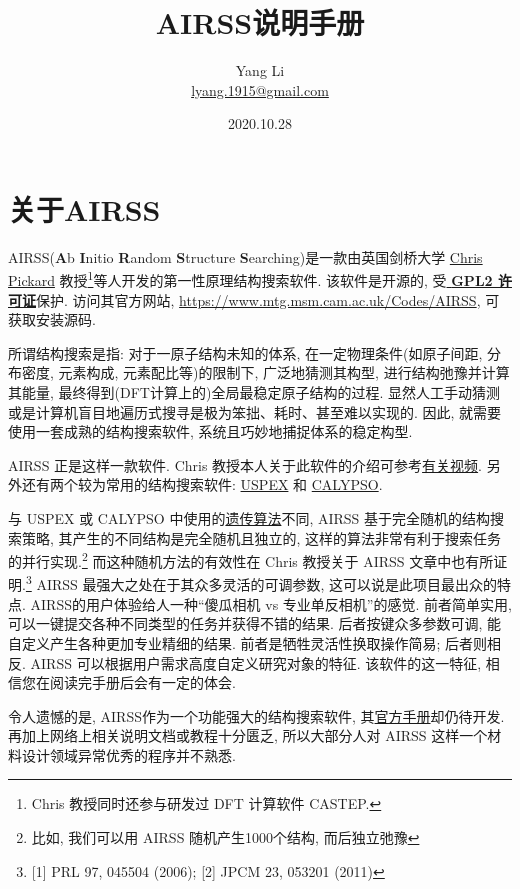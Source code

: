 \documentclass[a4paper, 10pt]{article}
\title{\textbf{AIRSS说明手册}}
\author{Yang Li\\ \href{mailto:lyang.1915@gmail.com}{lyang.1915@gmail.com}}
\date{2020.10.28}
\begin{document}
\maketitle
\tableofcontents

\newpage
\section{关于AIRSS}
AIRSS(\textbf{A}b \textbf{I}nitio \textbf{R}andom \textbf{S}tructure \textbf{S}earching)是一款由英国剑桥大学 \href{https://www.mtg.msm.cam.ac.uk/People/CJP}{Chris Pickard} 教授\footnote{Chris 教授同时还参与研发过 DFT 计算软件 CASTEP.}等人开发的第一性原理结构搜索软件. 该软件是开源的, 受\href{https://en.wikipedia.org/wiki/GNU_General_Public_License}{\textbf{ GPL2 许可证}}保护. 访问其官方网站, \url{https://www.mtg.msm.cam.ac.uk/Codes/AIRSS}, 可获取安装源码. 
  
所谓结构搜索是指: 对于一原子结构未知的体系, 在一定物理条件(如原子间距, 分布密度, 元素构成, 元素配比等)的限制下, 广泛地猜测其构型, 进行结构弛豫并计算其能量, 最终得到(DFT计算上的)全局最稳定原子结构的过程. 显然人工手动猜测或是计算机盲目地遍历式搜寻是极为笨拙、耗时、甚至难以实现的. 因此, 就需要使用一套成熟的结构搜索软件, 系统且巧妙地捕捉体系的稳定构型.

AIRSS 正是这样一款软件. Chris 教授本人关于此软件的介绍可参考\href{https://www.youtube.com/watch?v=xW6pOYEIKVs&t=1061s}{有关视频}. 另外还有两个较为常用的结构搜索软件: \href{https://uspex-team.org/en/uspex/downloads}{USPEX} 和 \href{http://www.calypso.cn}{CALYPSO}.

与 USPEX 或 CALYPSO 中使用的\href{https://en.wikipedia.org/wiki/Genetic_algorithm}{遗传算法}不同, AIRSS 基于完全随机的结构搜索策略, 其产生的不同结构是完全随机且独立的, 这样的算法非常有利于搜索任务的并行实现.\footnote{比如, 我们可以用 AIRSS 随机产生1000个结构, 而后独立弛豫} 而这种随机方法的有效性在 Chris 教授关于 AIRSS 文章中也有所证明.\footnote{ [1] PRL 97, 045504 (2006); [2] JPCM 23, 053201 (2011)} AIRSS 最强大之处在于其众多灵活的可调参数, 这可以说是此项目最出众的特点. AIRSS的用户体验给人一种``傻瓜相机 vs 专业单反相机''的感觉. 前者简单实用, 可以一键提交各种不同类型的任务并获得不错的结果. 后者按键众多参数可调, 能自定义产生各种更加专业精细的结果. 前者是牺牲灵活性换取操作简易; 后者则相反. AIRSS 可以根据用户需求高度自定义研究对象的特征. 该软件的这一特征, 相信您在阅读完手册后会有一定的体会.

令人遗憾的是, AIRSS作为一个功能强大的结构搜索软件, 其\href{https://airss-docs.github.io/technical-reference/buildcell-manual/}{官方手册}却仍待开发. 再加上网络上相关说明文档或教程十分匮乏, 所以大部分人对 AIRSS 这样一个材料设计领域异常优秀的程序并不熟悉. 
\end{document}
